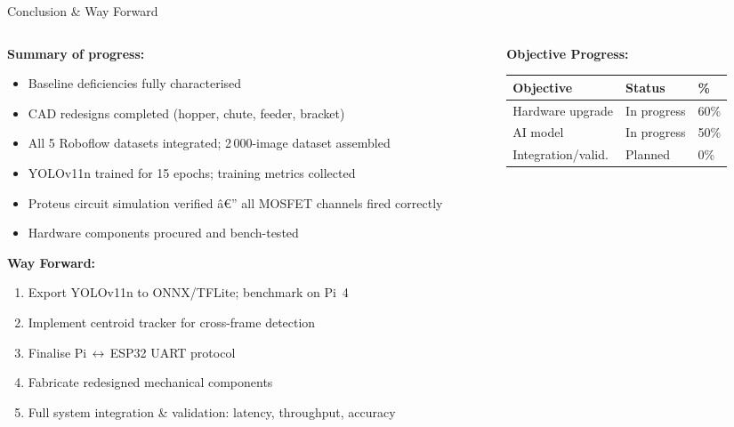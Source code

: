 \documentclass[aspectratio=169, 11pt]{beamer}
\begin{document}
\begin{frame}{Conclusion \& Way Forward}
\begin{columns}[T]
  \begin{column}{0.52\textwidth}
    \textbf{Summary of progress:}
    \begin{itemize}
      \item Baseline deficiencies fully characterised
      \item CAD redesigns completed (hopper, chute, feeder, bracket)
      \item All 5 Roboflow datasets integrated; 2\,000-image dataset assembled
      \item YOLOv11n trained for 15 epochs; training metrics collected
      \item Proteus circuit simulation verified â€” all MOSFET channels fired correctly
      \item Hardware components procured and bench-tested
    \end{itemize}
    \vspace{0.4em}
    \textbf{Way Forward:}
    \begin{enumerate}\setlength{\itemsep}{1pt}
      \item Export YOLOv11n to ONNX/TFLite; benchmark on Pi~4
      \item Implement centroid tracker for cross-frame detection
      \item Finalise Pi\,$\leftrightarrow$\,ESP32 UART protocol
      \item Fabricate redesigned mechanical components
      \item Full system integration \& validation:
            latency, throughput, accuracy
    \end{enumerate}
  \end{column}
  \begin{column}{0.45\textwidth}
    \centering
    \textbf{Objective Progress:}\\[4pt]
    \begin{tabular}{@{}lll@{}}
      \toprule
      \textbf{Objective} & \textbf{Status} & \textbf{\%}\\
      \midrule
      Hardware upgrade   & In progress & 60\% \\
      AI model           & In progress & 50\% \\
      Integration/valid. & Planned     & 0\%  \\
      \bottomrule
    \end{tabular}
  \end{column}
\end{columns}
\end{frame}
\end{document}
